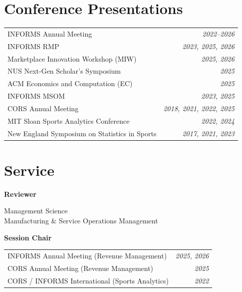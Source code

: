 \documentclass[11pt]{article}
\begin{document}
\section{Conference Presentations}

\begin{tabularx}{\textwidth}{@{}X r@{}}
INFORMS Annual Meeting                              & \textit{2022--2026}       \\[1pt]
INFORMS RMP                                         & \textit{2023, 2025, 2026}       \\[1pt]
Marketplace Innovation Workshop (MIW)               & \textit{2025, 2026}             \\[1pt]
NUS Next-Gen Scholar's Symposium                    & \textit{2025}             \\[1pt]
ACM Economics and Computation (EC)                  & \textit{2025}             \\[1pt]
INFORMS MSOM                                        & \textit{2023, 2025}       \\[1pt]
CORS Annual Meeting                                 & \textit{2018, 2021, 2022, 2025} \\[1pt]
MIT Sloan Sports Analytics Conference               & \textit{2022, 2024}       \\[1pt]
New England Symposium on Statistics in Sports       & \textit{2017, 2021, 2023} \\
\end{tabularx}

\section{Service}

\noindent\textbf{Reviewer}

Management Science\\
Manufacturing \& Service Operations Management

\vspace{8pt}

\noindent\textbf{Session Chair}
\vspace{4pt}

\begin{tabularx}{\textwidth}{@{}X r@{}}
INFORMS Annual Meeting (Revenue Management)       & \textit{2025, 2026} \\[1pt]
CORS Annual Meeting (Revenue Management)          & \textit{2025}       \\[1pt]
CORS / INFORMS International (Sports Analytics)   & \textit{2022}       \\
\end{tabularx}
\end{document}
